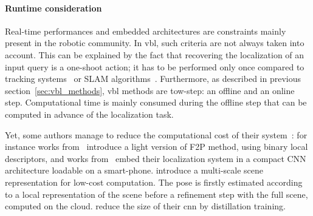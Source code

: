      	\paragraph{Runtime consideration}
	     	\label{para:runtime}
	     	Real-time performances and embedded architectures are constraints mainly present in the robotic community. In \ac{vbl}, such criteria are not always taken into account. This can be explained by the fact that recovering the localization of an input query is a one-shoot action; \ie it has to be performed only once compared to tracking systems~\citep{Marchand2016} or SLAM algorithms~\citep{Garcia-Fidalgo2015}. Furthermore, as described in previous section~\ref{sec:vbl_methods}, \ac{vbl} methods are tow-step: an offline and an online step. Computational time is mainly consumed during the offline step that can be computed in advance of the localization task.
	     	
	     	Yet, some authors manage to reduce the computational cost of their system~\citep{Shotton2013,Glocker2015,Lynen2015}: for instance works from~\citep{Feng2016a,Cheng2019} introduce a light version of F2P method, using binary local descriptors, and works from~\citep{Weyand2016,Kendall2015,Contreras2017} embed their localization system in a compact CNN architecture loadable on a smart-phone. \citet{Middelberg2014} introduce a multi-scale scene representation for low-cost computation. The pose is firstly estimated according to a local representation of the scene before a refinement step with the full scene, computed on the cloud. \citet{Sarlin2018a} reduce the size of their \ac{cnn} by distillation training.
	        
        
        
            